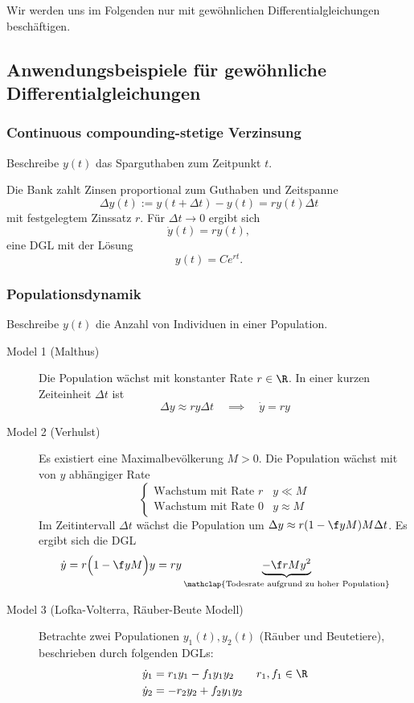 \documentclass[
]{mycourse}
\begin{document}
Wir werden uns im Folgenden nur mit gewöhnlichen Differentialgleichungen beschäftigen.

\subsection{Anwendungsbeispiele für gewöhnliche Differentialgleichungen}

\subsubsection{Continuous compounding-stetige Verzinsung}

Beschreibe $y(t)$ das Sparguthaben zum Zeitpunkt $t$.


Die Bank zahlt Zinsen proportional zum Guthaben und Zeitspanne
\[
	\Delta y(t) := y(t + \Delta t) - y(t) = r y(t) \Delta t
\]
mit festgelegtem Zinssatz $r$.
Für $\Delta t \to 0$ ergibt sich
\[
	\dot y (t) = ry(t),
\]
eine DGL mit der Lösung
\[
	y(t) = Ce^{rt}.
\]

\subsubsection{Populationsdynamik}

Beschreibe $y(t)$ die Anzahl von Individuen in einer Population.

\begin{description}
	\item[Model 1 (Malthus)]
		Die Population wächst mit konstanter Rate $r \in \R$.
		In einer kurzen Zeiteinheit $\Delta t$ ist
		\[
			\Delta y \approx ry \Delta t
			\quad \implies \quad
			\dot y = r y
		\]
	\item[Model 2 (Verhulst)]
		Es existiert eine Maximalbevölkerung $M > 0$.
		Die Population wächst mit von $y$ abhängiger Rate
		\[
			\begin{cases}
				\text{Wachstum mit Rate $r$} & y \ll M \\
				\text{Wachstum mit Rate $0$} & y \approx M
			\end{cases}
		\]
		Im Zeitintervall $\Delta t$ wächst die Population um $\Delta y \approx r(1-\f yM) M \Delta t$.
		Es ergibt sich die DGL
		\[
			\dot y = r \Big(1 - \f yM\Big) y = ry \underbrace{- \f rM y^2}_{\mathclap{\text{Todesrate aufgrund zu hoher Population}}}
		\]
	\item[Model 3 (Lofka-Volterra, Räuber-Beute Modell)]
		Betrachte zwei Populationen $y_1(t), y_2(t)$ (Räuber und Beutetiere), beschrieben durch folgenden DGLs:
		\begin{align*}
			\dot y_1 &= r_1 y_1 - f_1y_1y_2
			\qquad r_1,f_1 \in \R \\
			\dot y_2 &= -r_2 y_2 + f_2 y_1y_2
		\end{align*}
\end{description}
\end{document}
